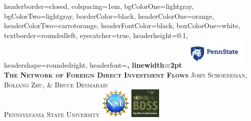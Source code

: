 \documentclass[landscape,a0paper,fontscale=0.285]{baposter} %
\begin{document}
\begin{poster}
{
headerborder=closed, %
colspacing=1em, %
bgColorOne=lightgray, %
bgColorTwo=lightgray, %
borderColor=black, %
headerColorOne=orange, %
headerColorTwo=carrotorange, %
headerFontColor=black, %
boxColorOne=white, %
textborder=roundedleft, %
eyecatcher=true, %
headerheight=0.1\textheight, %
headershape=roundedright, %
headerfont=\Large\bf\textsc, %
linewidth=2pt %
}
%
{\includegraphics[height=4em]{PS_HOR_RGB_2C.png}} %
{\bf\textsc{The Network of Foreign Direct Investment Flows}\vspace{0.5em}} %
{\textsc{John Schoeneman, Boliang Zhu, \& Bruce Desmarais\\
Pennsylvania State University}} %
{
{\includegraphics[height=4em]{nsf.png}} %
{\includegraphics[height=4em]{bdss.png}}
}


\end{poster}
\end{document}
